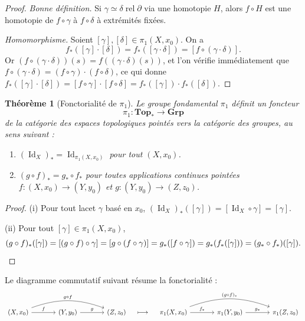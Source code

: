 \documentclass[12pt,a4paper,openany]{book}
\theoremstyle{definition}
\theoremstyle{plain}
\newtheorem{theoreme}[definition]{Théorème}
\theoremstyle{remark}
\DeclareMathOperator{\Id}{Id}
\newcommand{\rel}{\operatorname{rel}}
\begin{document}
\begin{proof}
\emph{Bonne définition.} Si $\gamma \simeq \delta \rel \partial$ via une
homotopie $H$, alors $f \circ H$ est une homotopie de $f \circ \gamma$ à
$f \circ \delta$ à extrémités fixées.

\emph{Homomorphisme.} Soient $[\gamma], [\delta] \in \pi_1(X, x_0)$. On a
\[
f_*([\gamma] \cdot [\delta]) = f_*([\gamma \cdot \delta]) = [f \circ (\gamma \cdot \delta)].
\]
Or $(f \circ (\gamma \cdot \delta))(s) = f((\gamma \cdot \delta)(s))$, et l'on
vérifie immédiatement que $f \circ (\gamma \cdot \delta) = (f \circ \gamma) \cdot
(f \circ \delta)$, ce qui donne
$f_*([\gamma] \cdot [\delta]) = [f \circ \gamma] \cdot [f \circ \delta] =
f_*([\gamma]) \cdot f_*([\delta])$.
\end{proof}

\begin{theoreme}[Fonctorialité de $\pi_1$]\label{thm:pi1-foncteur}
Le groupe fondamental $\pi_1$ définit un foncteur
\[
\pi_1 : \mathbf{Top}_* \longrightarrow \mathbf{Grp}
\]
de la catégorie des espaces topologiques pointés vers la catégorie des groupes,
au sens suivant :
\begin{enumerate}[label=(\roman*)]
\item $(\Id_X)_* = \Id_{\pi_1(X, x_0)}$ pour tout $(X, x_0)$.
\item $(g \circ f)_* = g_* \circ f_*$ pour toutes applications continues
pointées $f : (X, x_0) \to (Y, y_0)$ et $g : (Y, y_0) \to (Z, z_0)$.
\end{enumerate}
\end{theoreme}

\begin{proof}
(i) Pour tout lacet $\gamma$ basé en $x_0$, $(\Id_X)_*([\gamma]) =
[\Id_X \circ \gamma] = [\gamma]$.

(ii) Pour tout $[\gamma] \in \pi_1(X, x_0)$,
\[
(g \circ f)_*([\gamma]) = [(g \circ f) \circ \gamma] = [g \circ (f \circ \gamma)]
= g_*([f \circ \gamma]) = g_*(f_*([\gamma])) = (g_* \circ f_*)([\gamma]).
\qedhere
\]
\end{proof}

Le diagramme commutatif suivant résume la fonctorialité :
\[
\begin{tikzcd}[column sep=large, row sep=large]
(X, x_0) \arrow[r, "f"] \arrow[rr, bend left=20, "g \circ f"] & (Y, y_0) \arrow[r, "g"] & (Z, z_0)
\end{tikzcd}
\quad \longmapsto \quad
\begin{tikzcd}[column sep=large, row sep=large]
\pi_1(X, x_0) \arrow[r, "f_*"] \arrow[rr, bend left=20, "(g \circ f)_*"] & \pi_1(Y, y_0) \arrow[r, "g_*"] & \pi_1(Z, z_0)
\end{tikzcd}
\]
\end{document}
